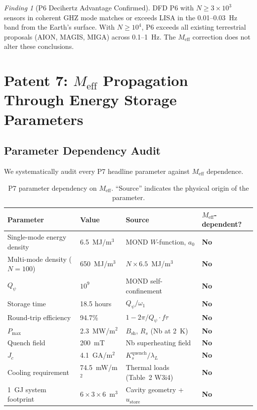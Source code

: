 \documentclass[11pt]{article}
\theoremstyle{definition}
\theoremstyle{remark}
\newtheorem{finding}[theorem]{Finding}
\newcommand{\ee}[1]{\times10^{#1}}
\newcommand{\Meff}{M_{\mathrm{eff}}}
\newcommand{\Qpsi}{Q_\psi}
\newcommand{\Pmax}{P_{\mathrm{max}}}
\begin{document}
\begin{finding}[P6 Decihertz Advantage Confirmed]
\label{finding:competitive}
DFD P6 with $N \geq 3\ee{3}$ sensors in coherent GHZ mode matches or
exceeds LISA in the 0.01--0.03~Hz band from the Earth's surface.
With $N \geq 10^4$, P6 exceeds all existing terrestrial proposals (AION,
MAGIS, MIGA) across 0.1--1~Hz. The $\Meff$ correction does not alter
these conclusions.
\end{finding}

\section{Patent 7: $\Meff$ Propagation Through Energy Storage Parameters}
\label{sec:P7}

\subsection{Parameter Dependency Audit}

We systematically audit every P7 headline parameter against $\Meff$ dependence.

\begin{table}[h]
\centering
\caption{P7 parameter dependency on $\Meff$. ``Source'' indicates the
physical origin of the parameter.}
\label{tab:P7-audit}
\begin{tabular}{@{}p{4.5cm}lll@{}}
\toprule
Parameter & Value & Source & $\Meff$-dependent? \\
\midrule
Single-mode energy density & 6.5~MJ/m$^3$
  & MOND $W$-function, $a_0$ & \textbf{No} \\
Multi-mode density ($N=100$) & 650~MJ/m$^3$
  & $N \times 6.5$~MJ/m$^3$ & \textbf{No} \\
$\Qpsi$ & $10^9$
  & MOND self-confinement & \textbf{No} \\
Storage time & 18.5 hours
  & $\Qpsi/\omega_1$ & \textbf{No} \\
Round-trip efficiency & 94.7\%
  & $1 - 2\pi/\Qpsi \cdot f \tau$ & \textbf{No} \\
$\Pmax$ & 2.3~MW/m$^2$
  & $B_{\mathrm{sh}}$, $R_s$ (Nb at 2~K) & \textbf{No} \\
Quench field & 200~mT
  & Nb superheating field & \textbf{No} \\
$J_c$ & 4.1~GA/m$^2$
  & $K_s^{\mathrm{quench}}/\lambda_L$ & \textbf{No} \\
Cooling requirement & 74.5~mW/m$^2$
  & Thermal loads (Table~2 W3i4) & \textbf{No} \\
1~GJ system footprint & $6\times3\times6$~m$^3$
  & Cavity geometry + $u_{\mathrm{store}}$ & \textbf{No} \\
\bottomrule
\end{tabular}
\end{table}
\end{document}
